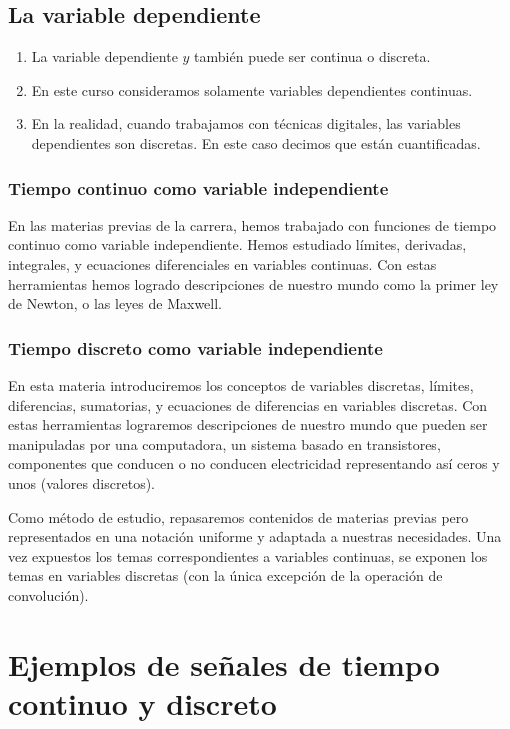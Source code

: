 \subsection{La variable dependiente}

\begin{enumerate}
	\item La variable dependiente $y$ también puede ser continua o discreta.
	\item En este curso consideramos solamente variables dependientes continuas.
	\item En la realidad, cuando trabajamos con técnicas digitales, las variables dependientes son discretas. En este caso decimos que están cuantificadas.
\end{enumerate}

\subsubsection{Tiempo continuo como variable independiente}
En las materias previas de la carrera, hemos trabajado con funciones de tiempo continuo como variable independiente. Hemos estudiado límites, derivadas, integrales, y ecuaciones diferenciales en variables continuas. Con estas herramientas hemos logrado descripciones de nuestro mundo como la primer ley de Newton, o las leyes de Maxwell.

\subsubsection{Tiempo discreto como variable independiente}
En esta materia introduciremos los conceptos de variables discretas, límites, diferencias, sumatorias, y ecuaciones de diferencias en variables discretas. Con estas herramientas lograremos descripciones de nuestro mundo que pueden ser manipuladas por una computadora, un sistema basado en transistores, componentes que conducen o no conducen electricidad representando así ceros y unos (valores discretos).

Como método de estudio, repasaremos contenidos de materias previas pero representados en una notación uniforme y adaptada a nuestras necesidades. Una vez expuestos los temas correspondientes a variables continuas, se exponen los temas en variables discretas (con la única excepción de la operación de convolución).

\section{Ejemplos de señales de tiempo continuo y discreto}

